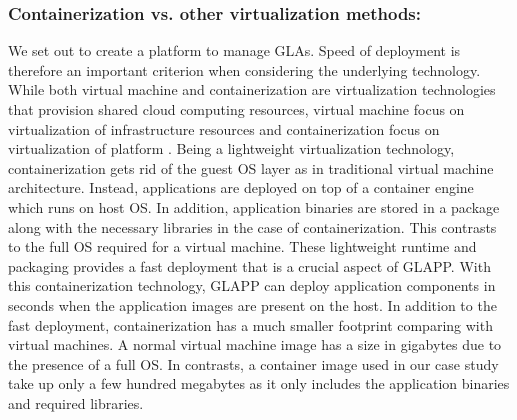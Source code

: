 \documentclass{seal_thesis}
\begin{document}
\subsubsection{Containerization vs. other virtualization methods:}
We set out to create a platform to manage GLAs.
Speed of deployment is therefore an important criterion when considering the underlying technology.
While both virtual machine and containerization are virtualization technologies that provision shared cloud computing resources, virtual machine focus on virtualization of infrastructure resources and containerization focus on virtualization of platform .
Being a lightweight virtualization technology, containerization gets rid of the guest OS layer as in traditional virtual machine architecture.
Instead, applications are deployed on top of a container engine which runs on host OS.
In addition, application binaries are stored in a package along with the necessary libraries in the case of containerization.
This contrasts to the full OS required for a virtual machine.
These lightweight runtime and packaging provides a fast deployment that is a crucial aspect of GLAPP.
With this containerization technology, GLAPP can deploy application components in seconds when the application images are present on the host.
In addition to the fast deployment, containerization has a much smaller footprint comparing with virtual machines.
A normal virtual machine image has a size in gigabytes due to the presence of a full OS.
In contrasts, a container image used in our case study take up only a few hundred megabytes as it only includes the application binaries and required libraries.



\end{document}
